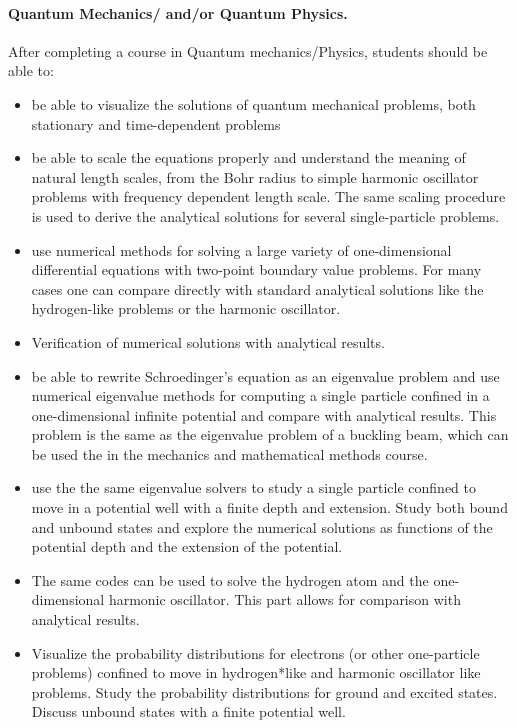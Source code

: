 \documentclass[graybox,envcountchap,sectrefs]{svmult}
\begin{document}
\paragraph{Quantum Mechanics/ and/or Quantum Physics.}
After completing a course in Quantum mechanics/Physics, students should be able to:
\begin{itemize}
\item be able to visualize the solutions of quantum mechanical problems, both stationary and time-dependent problems

\item be able to scale the equations properly and understand the meaning of natural length scales, from the Bohr radius to simple harmonic oscillator problems with frequency dependent length scale. The same scaling procedure is  used to derive the analytical solutions for several single-particle problems.

\item use numerical methods for solving a large variety of one-dimensional differential equations with two-point boundary value problems. For many cases one can compare directly with standard analytical  solutions like the hydrogen-like problems or the harmonic oscillator.

\item Verification of numerical solutions with analytical results.

\item be able to rewrite Schroedinger's equation as an eigenvalue problem and use numerical eigenvalue methods for computing a single particle confined in a one-dimensional infinite potential and compare with analytical results. This problem is the same as the eigenvalue problem of a buckling beam, which can be used the in the mechanics and mathematical methods course.

\item use the the same eigenvalue solvers to study a single particle confined to move in a potential well with a finite depth and extension. Study both bound and unbound states and explore the numerical solutions as functions of the potential depth and the extension of the potential.

\item The same codes can be used to solve the hydrogen atom and the one-dimensional harmonic oscillator. This part allows for comparison with analytical results.

\item Visualize the probability distributions for electrons (or other one-particle problems) confined to move in hydrogen*like and harmonic oscillator like problems. Study the probability distributions for ground and excited states. Discuss unbound states with a finite potential well.


\end{itemize}
\end{document}
